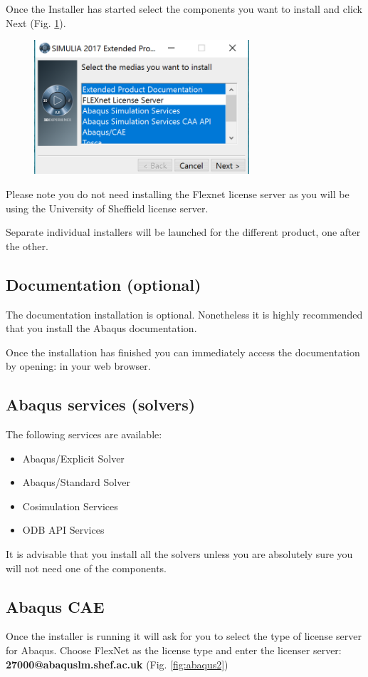 \documentclass[10pt,a4paper,oneside]{article}
\begin{document}
Once the Installer has started select the components you want to install and click Next (Fig. \ref{fig:abaqus1}).
\begin{figure}[h]
\centering
\includegraphics[width=8cm]{installer1.png} 
\caption{}
\label{fig:abaqus1}
\end{figure}
Please note you do not need installing the Flexnet license server as you will be using the University of Sheffield license server.

Separate individual installers will be launched for the different product, one after the other.

\subsection{Documentation (optional)}
The documentation installation is optional. Nonetheless it is highly recommended that you install the Abaqus documentation.

Once the installation has finished you can immediately access the documentation by opening:
  in your web browser.

\subsection{Abaqus services (solvers)}
The following services are available:
\begin{itemize}
\item  Abaqus/Explicit Solver
\item Abaqus/Standard Solver
\item Cosimulation Services
\item ODB API Services
\end{itemize}
It is advisable that you install all the solvers unless you are absolutely sure you will not need one of the components. 


\subsection{Abaqus CAE}
Once the installer is running it will ask for you to select the type of license server for Abaqus. Choose FlexNet as the license type and enter the licenser server: \textbf{27000@abaquslm.shef.ac.uk} (Fig. \ref{fig:abaqus2})
\end{document}
